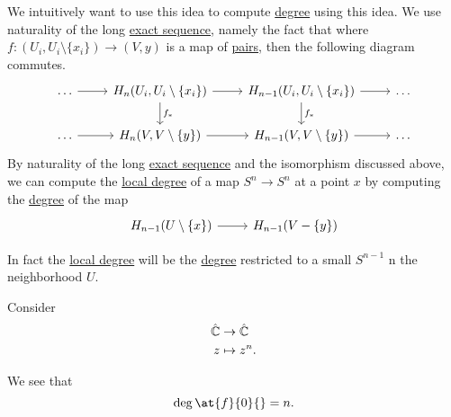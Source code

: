 We intuitively want to use this idea to compute \hyperref[def:degree]{degree} using this idea. We use naturality of the long \hyperref[def:exact-sequence]{exact sequence},
namely the fact that where \(f \colon (U_i, U_i \setminus \{x_i\}) \to (V, y)\) is a map of \hyperref[def:good-pair]{pairs}, then the following diagram commutes.
\[
	\begin{tikzcd}
		\ldots & {H_n(U_i, U_i\setminus\{x_i\})} & {H_{n-1}(U_i, U_i\setminus\{x_i\})} & \ldots \\
		\ldots & {H_n(V, V\setminus\{y\})} & {H_{n-1}(V, V\setminus\{y\})} & \ldots
		\arrow[from=1-1, to=1-2]
		\arrow[from=1-2, to=1-3]
		\arrow[from=1-3, to=1-4]
		\arrow["{f_\ast}", from=1-3, to=2-3]
		\arrow[from=2-3, to=2-4]
		\arrow[from=2-2, to=2-3]
		\arrow["{f_\ast}", from=1-2, to=2-2]
		\arrow[from=2-1, to=2-2]
	\end{tikzcd}
\]
By naturality of the long \hyperref[def:exact-sequence]{exact sequence} and the isomorphism discussed above, we can compute the \hyperref[def:local-degree]{local degree}
of a map \(S^n \to S^n\) at a point \(x\) by computing the \hyperref[def:degree]{degree} of the map
\[
	\begin{tikzcd}
		{H_{n-1}(U\setminus\{x\})} & {H_{n-1}(V-\{y\})}
		\arrow[from=1-1, to=1-2]
	\end{tikzcd}
\]

In fact the \hyperref[def:local-degree]{local degree} will be the \hyperref[def:degree]{degree} restricted to a small \(S^{n - 1}\) n the neighborhood \(U\).
\begin{figure}[H]
	\centering
	\label{fig:computing-local-homology-idea}
\end{figure}

\begin{eg}
	Consider
	\[
		\begin{split}
			\hat{\mathbb{\MakeUppercase{c}}} & \to \hat{\mathbb{\MakeUppercase{c}}}\\
			z&\mapsto z^n.
		\end{split}
	\]

	\begin{figure}[H]
		\centering
		\label{fig:eg:lec31-degree-n}
	\end{figure}

	We see that
	\[
		\deg \at{f}{0}{} = n.
	\]
\end{eg}